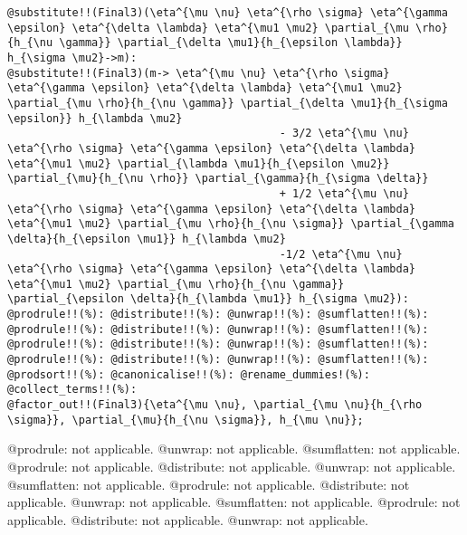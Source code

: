 \documentclass[11pt]{article}
\begin{document}
{\begin{verbatim}
@substitute!!(Final3)(\eta^{\mu \nu} \eta^{\rho \sigma} \eta^{\gamma \epsilon} \eta^{\delta \lambda} \eta^{\mu1 \mu2} \partial_{\mu \rho}{h_{\nu \gamma}} \partial_{\delta \mu1}{h_{\epsilon \lambda}} h_{\sigma \mu2}->m):
@substitute!!(Final3)(m-> \eta^{\mu \nu} \eta^{\rho \sigma} \eta^{\gamma \epsilon} \eta^{\delta \lambda} \eta^{\mu1 \mu2} \partial_{\mu \rho}{h_{\nu \gamma}} \partial_{\delta \mu1}{h_{\sigma \epsilon}} h_{\lambda \mu2}
                                          - 3/2 \eta^{\mu \nu} \eta^{\rho \sigma} \eta^{\gamma \epsilon} \eta^{\delta \lambda} \eta^{\mu1 \mu2} \partial_{\lambda \mu1}{h_{\epsilon \mu2}} \partial_{\mu}{h_{\nu \rho}} \partial_{\gamma}{h_{\sigma \delta}}
                                          + 1/2 \eta^{\mu \nu} \eta^{\rho \sigma} \eta^{\gamma \epsilon} \eta^{\delta \lambda} \eta^{\mu1 \mu2} \partial_{\mu \rho}{h_{\nu \sigma}} \partial_{\gamma \delta}{h_{\epsilon \mu1}} h_{\lambda \mu2}
                                          -1/2 \eta^{\mu \nu} \eta^{\rho \sigma} \eta^{\gamma \epsilon} \eta^{\delta \lambda} \eta^{\mu1 \mu2} \partial_{\mu \rho}{h_{\nu \gamma}} \partial_{\epsilon \delta}{h_{\lambda \mu1}} h_{\sigma \mu2}):
@prodrule!!(%): @distribute!!(%): @unwrap!!(%): @sumflatten!!(%):
@prodrule!!(%): @distribute!!(%): @unwrap!!(%): @sumflatten!!(%):
@prodrule!!(%): @distribute!!(%): @unwrap!!(%): @sumflatten!!(%):
@prodrule!!(%): @distribute!!(%): @unwrap!!(%): @sumflatten!!(%):
@prodsort!!(%): @canonicalise!!(%): @rename_dummies!(%): @collect_terms!!(%):
@factor_out!!(Final3){\eta^{\mu \nu}, \partial_{\mu \nu}{h_{\rho \sigma}}, \partial_{\mu}{h_{\nu \sigma}}, h_{\mu \nu}};
\end{verbatim}}
@prodrule: not applicable.
@unwrap: not applicable.
@sumflatten: not applicable.
@prodrule: not applicable.
@distribute: not applicable.
@unwrap: not applicable.
@sumflatten: not applicable.
@prodrule: not applicable.
@distribute: not applicable.
@unwrap: not applicable.
@sumflatten: not applicable.
@prodrule: not applicable.
@distribute: not applicable.
@unwrap: not applicable.
\end{document}
